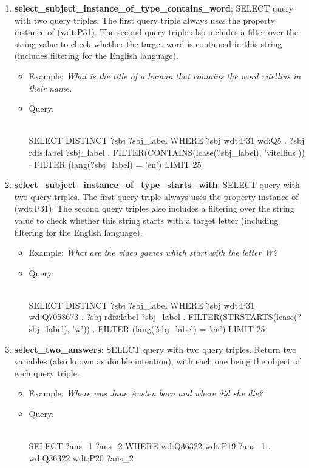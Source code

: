 \begin{enumerate}
    \item \textbf{select\_subject\_instance\_of\_type\_contains\_word}: SELECT query with two query triples. 
    The first query triple always uses the property instance of (wdt:P31). The second query triple 
    also includes a filter over the string value to check whether the target word is contained in 
    this string (includes filtering for the English language).
    \begin{itemize}
        \item Example: \textit{What is the title of a human that contains the word vitellius in their 
        name.}
        \item Query:\\
        \mbox{}\\
        \begin{sparqlcode}[]
SELECT DISTINCT ?sbj ?sbj_label WHERE { 
    ?sbj wdt:P31 wd:Q5 . 
    ?sbj rdfs:label ?sbj_label . 
    FILTER(CONTAINS(lcase(?sbj_label), 'vitellius')) . 
    FILTER (lang(?sbj_label) = 'en') 
} LIMIT 25
        \end{sparqlcode}
    \end{itemize}
    
    \item \textbf{select\_subject\_instance\_of\_type\_starts\_with}: SELECT query with two query triples. 
    The first query triple always uses the property instance of (wdt:P31). The second query triples 
    also includes a filtering over the string value to check whether this string starts with a target 
    letter (including filtering for the  English language).
    \begin{itemize}
        \item Example: \textit{What are the video games which start with the letter W?}
        \item Query:\\
        \mbox{}\\
        \begin{sparqlcode}[]
SELECT DISTINCT ?sbj ?sbj_label WHERE { 
    ?sbj wdt:P31 wd:Q7058673 . 
    ?sbj rdfs:label ?sbj_label . 
    FILTER(STRSTARTS(lcase(?sbj_label), 'w')) . 
    FILTER (lang(?sbj_label) = 'en') 
} LIMIT 25
        \end{sparqlcode}
    \end{itemize}
    
    \item \textbf{select\_two\_answers}: SELECT query with two query triples. Return two variables 
    (also known as double intention), with each one being the object of each query triple.
    \begin{itemize}
        \item Example: \textit{Where was Jane Austen born and where did she die?}
        \item Query:\\
        \mbox{}\\
        \begin{sparqlcode}[]
SELECT ?ans_1 ?ans_2 WHERE { 
    wd:Q36322 wdt:P19 ?ans_1 . 
    wd:Q36322 wdt:P20 ?ans_2 
}
        \end{sparqlcode}
    \end{itemize}
    

\end{enumerate}
